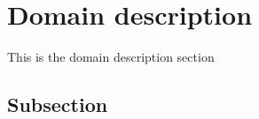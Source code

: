 \section{Domain description}\label{Section label}
This is the domain description section
\subsection{Subsection}\label{subsection}